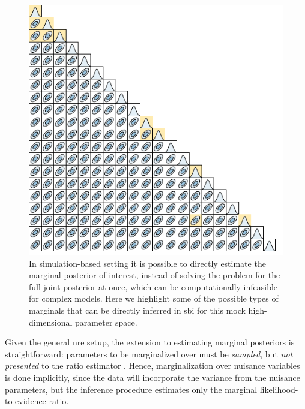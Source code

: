 \begin{figure}
    \centering
	\includegraphics[width=\linewidth]{TikZ/corner.pdf}
    \caption{In simulation-based setting it is possible to directly estimate the marginal posterior of interest, instead of solving the problem for the full joint posterior at once, which can be computationally infeasible for complex models. Here we highlight some of the possible types of marginals that can be directly inferred in \gls*{sbi} for this mock high-dimensional parameter space.}
    \label{fig:sbi-marginals}
\end{figure}


Given the general \gls*{nre} setup, the extension to estimating marginal posteriors is straightforward: parameters to be marginalized over must be \emph{sampled}, but \emph{not presented} to the ratio estimator  \cite{Miller:2020hua}. Hence, marginalization over nuisance variables is done implicitly, since the data will incorporate the variance from the nuisance parameters, but the inference procedure estimates only the marginal likelihood-to-evidence ratio.

